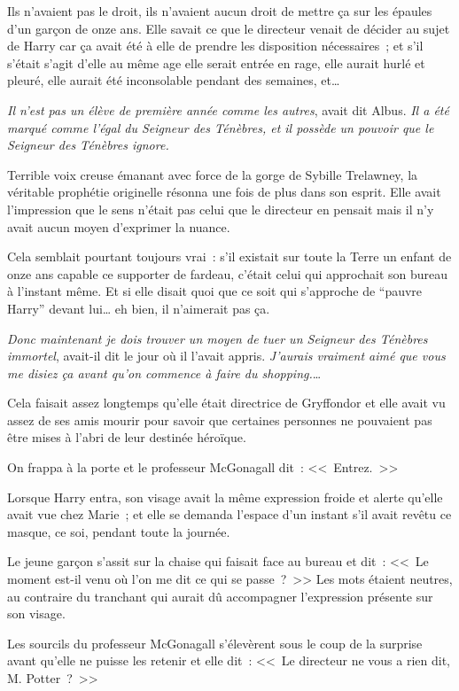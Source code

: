 Ils n'avaient pas le droit, ils n'avaient aucun droit de mettre ça sur les épaules d'un garçon de onze ans. Elle savait ce que le directeur venait de décider au sujet de Harry car ça avait été à elle de prendre les disposition nécessaires~; et s'il s'était s'agit d'elle au même age elle serait entrée en rage, elle aurait hurlé et pleuré, elle aurait été inconsolable pendant des semaines, et…

\emph{Il n'est pas un élève de première année comme les autres}, avait dit Albus. \emph{Il a été marqué comme l'égal du Seigneur des Ténèbres, et il possède un pouvoir que le Seigneur des Ténèbres ignore.}

Terrible voix creuse émanant avec force de la gorge de Sybille Trelawney, la véritable prophétie originelle résonna une fois de plus dans son esprit. Elle avait l'impression que le sens n'était pas celui que le directeur en pensait mais il n’y avait aucun moyen d'exprimer la nuance.

Cela semblait pourtant toujours vrai~: s'il existait sur toute la Terre un enfant de onze ans capable ce supporter de fardeau, c'était celui qui approchait son bureau à l'instant même. Et si elle disait quoi que ce soit qui s'approche de “pauvre Harry” devant lui… eh bien, il n'aimerait pas ça.

\emph{Donc maintenant je dois trouver un moyen de tuer un Seigneur des Ténèbres immortel}, avait-il dit le jour où il l'avait appris. \emph{J'aurais vraiment aimé que vous me disiez ça avant qu'on commence à faire du shopping.}…

Cela faisait assez longtemps qu'elle était directrice de Gryffondor et elle avait vu assez de ses amis mourir pour savoir que certaines personnes ne pouvaient pas être mises à l'abri de leur destinée héroïque.

On frappa à la porte et le professeur McGonagall dit~: <<~Entrez.~>>

Lorsque Harry entra, son visage avait la même expression froide et alerte qu'elle avait vue chez Marie~; et elle se demanda l'espace d'un instant s'il avait revêtu ce masque, ce soi, pendant toute la journée.

Le jeune garçon s'assit sur la chaise qui faisait face au bureau et dit~: <<~Le moment est-il venu où l'on me dit ce qui se passe~?~>> Les mots étaient neutres, au contraire du tranchant qui aurait dû accompagner l'expression présente sur son visage.

Les sourcils du professeur McGonagall s'élevèrent sous le coup de la surprise avant qu'elle ne puisse les retenir et elle dit~: <<~Le directeur ne vous a rien dit, M. Potter~?~>>

